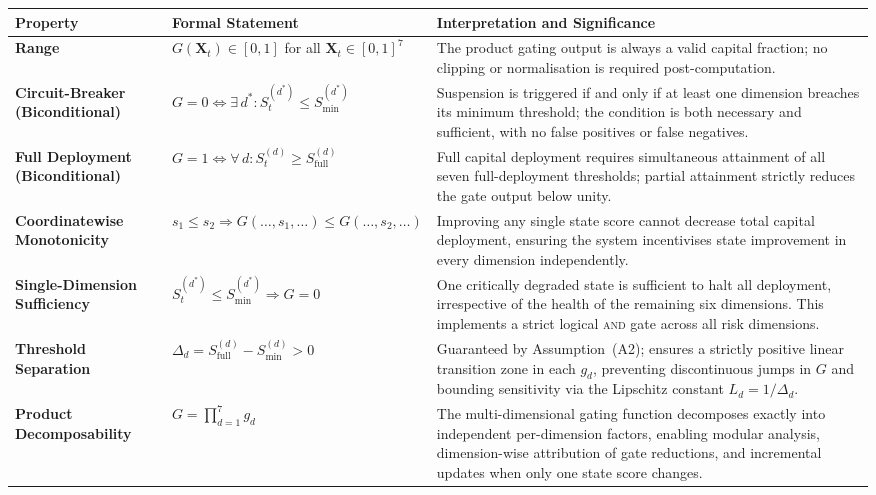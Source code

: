 \documentclass[12pt,openany]{book}
\numberwithin{equation}{chapter}
\theoremstyle{plain}
\theoremstyle{definition}
\theoremstyle{remark}
\renewcommand{\arraystretch}{1.2}
\def\mathcal#1{#1}%
\begin{document}
\begin{center}
\renewcommand{\arraystretch}{1.45}
\begin{tabularx}{\linewidth}{@{}
  >{\small\bfseries\RaggedRight}p{3.8cm}
  >{\raggedright\arraybackslash}p{4.2cm}
  >{\raggedright\arraybackslash}X
  @{}}
\toprule
\textbf{Property} &
\textbf{Formal Statement} &
\textbf{Interpretation and Significance} \\
\midrule
Range &
$G(\mathbf{X}_t) \in [0,1]$
for all $\mathbf{X}_t \in [0,1]^7$ &
The product gating output is always a valid capital
fraction; no clipping or normalisation is required
post-computation. \\[4pt]
Circuit-Breaker (Biconditional) &
$G = 0 \Leftrightarrow \exists\,d^*:
\mathcal{S}_t^{(d^*)}
\leq \mathcal{S}_{\min}^{(d^*)}$ &
Suspension is triggered if and only if at least one
dimension breaches its minimum threshold; the condition
is both necessary and sufficient, with no false
positives or false negatives. \\[4pt]
Full Deployment (Biconditional) &
$G = 1 \Leftrightarrow \forall\,d:
\mathcal{S}_t^{(d)}
\geq \mathcal{S}_{\mathrm{full}}^{(d)}$ &
Full capital deployment requires simultaneous
attainment of all seven full-deployment thresholds;
partial attainment strictly reduces the gate output
below unity. \\[4pt]
Coordinatewise Monotonicity &
$s_1 \leq s_2 \Rightarrow
G(\ldots,s_1,\ldots) \leq
G(\ldots,s_2,\ldots)$ &
Improving any single state score cannot decrease
total capital deployment, ensuring the system
incentivises state improvement in every dimension
independently. \\[4pt]
Single-Dimension Sufficiency &
$\mathcal{S}_t^{(d^*)}
\leq \mathcal{S}_{\min}^{(d^*)}
\Rightarrow G = 0$ &
One critically degraded state is sufficient to
halt all deployment, irrespective of the
health of the remaining six dimensions.
This implements a strict logical \textsc{and}
gate across all risk dimensions. \\[4pt]
Threshold Separation &
$\Delta_d =
\mathcal{S}_{\mathrm{full}}^{(d)}
- \mathcal{S}_{\min}^{(d)} > 0$ &
Guaranteed by Assumption~(A2); ensures a
strictly positive linear transition zone in each
$g_d$, preventing discontinuous jumps in $G$ and
bounding sensitivity via the Lipschitz constant
$L_d = 1/\Delta_d$. \\[4pt]
Product Decomposability &
$G = \prod_{d=1}^{7} g_d$ &
The multi-dimensional gating function decomposes
exactly into independent per-dimension factors,
enabling modular analysis, dimension-wise
attribution of gate reductions, and incremental
updates when only one state score changes. \\
\bottomrule
\end{tabularx}
\end{center}
\end{document}
